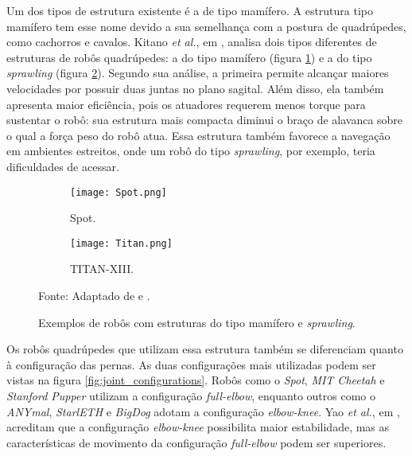 \documentclass[conference]{IEEEtran}
\begin{document}
Um dos tipos de estrutura existente é a de tipo mamífero. A estrutura tipo mamífero tem esse nome devido a sua semelhança com a postura de quadrúpedes, como cachorros e cavalos. Kitano \textit{et al.}, em \cite{Kitano2016}, analisa dois tipos diferentes de estruturas de robôs quadrúpedes: a do tipo mamífero (figura \ref{fig:robots_structures_b}) e a do tipo \textit{sprawling} (figura \ref{fig:robots_structures_c}). Segundo sua análise, a primeira permite alcançar maiores velocidades por possuir duas juntas no plano sagital. Além disso, ela também apresenta maior eficiência, pois os atuadores requerem menos torque para sustentar o robô: sua estrutura mais compacta diminui o braço de alavanca sobre o qual a força peso do robô atua. Essa estrutura também favorece a navegação em ambientes estreitos, onde um robô do tipo \textit{sprawling}, por exemplo, teria dificuldades de acessar.

\begin{figure}[htbp]
    \centering
    \begin{subfigure}[htbp]{0.23\textwidth}
        \centering
        \texttt{[image: Spot.png]}
        \caption{Spot.}
        \label{fig:robots_structures_b}
    \end{subfigure}
    \begin{subfigure}[htbp]{0.23\textwidth}
        \centering
        \texttt{[image: Titan.png]}
        \caption{TITAN-XIII.}
        \label{fig:robots_structures_c}
    \end{subfigure}
    \centering
    \caption{Exemplos de robôs com estruturas do tipo mamífero e \textit{sprawling}.}
    Fonte: Adaptado de  \cite{Kitano2016} e \cite{SpotImg1}.
    \label{fig:robots_structures}
\end{figure}

Os robôs quadrúpedes que utilizam essa estrutura também se diferenciam quanto à configuração das pernas. As duas configurações mais utilizadas podem ser vistas na figura \ref{fig:joint_configurations}. Robôs como o \textit{Spot}, \textit{MIT Cheetah} e \textit{Stanford Pupper} utilizam a configuração \textit{full-elbow}, enquanto outros como o \textit{ANYmal}, \textit{StarlETH} e \textit{BigDog} adotam a configuração \textit{elbow-knee}. Yao \textit{et al.}, em \cite{Yao2021}, acreditam que a configuração \textit{elbow-knee} possibilita maior estabilidade, mas as características de movimento da configuração \textit{full-elbow} podem ser superiores.
\end{document}
